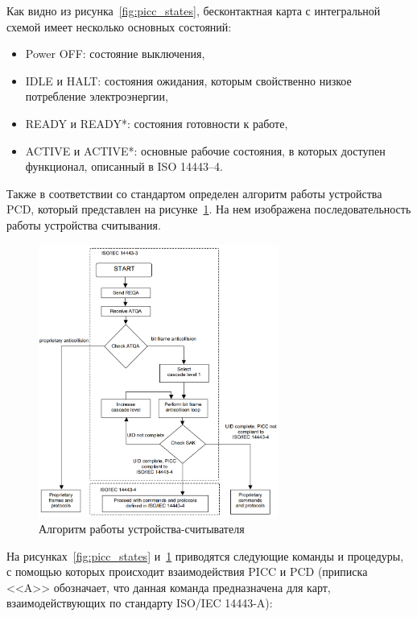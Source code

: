 Как видно из рисунка~\ref{fig:picc_states}, бесконтактная карта с интегральной схемой имеет несколько основных состояний:

\begin{itemize}
    \item Power OFF: состояние выключения,
    \item IDLE и HALT: состояния ожидания, которым свойственно низкое потребление электроэнергии,
    \item READY и READY*: состояния готовности к работе,
    \item ACTIVE и ACTIVE*: основные рабочие состояния, в которых доступен функционал, описанный в ISO 14443--4.
\end{itemize}

Также в соответствии со стандартом определен алгоритм работы устройства PCD, который представлен на рисунке~\ref{fig:pcd_flow}.
На нем изображена последовательность работы устройства считывания.

\begin{figure}[H]
    \centering
    \includegraphics[width=0.7\textwidth]{images/research/pcd_flow}
    \caption{\centering Алгоритм работы устройства-считывателя}
    \label{fig:pcd_flow}
\end{figure}


На рисунках~\ref{fig:picc_states} и~\ref{fig:pcd_flow} приводятся следующие команды и процедуры, с помощью которых происходит взаимодействия PICC и PCD (приписка <<A>> обозначает, что данная команда предназначена для карт, взаимодействующих по стандарту ISO/IEC 14443-A):

